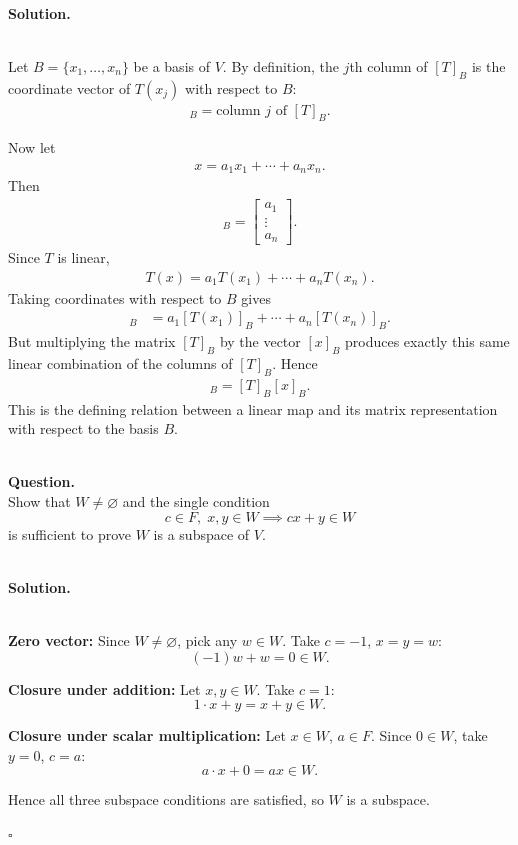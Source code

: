 \documentclass{article}
\begin{document}
\noindent\\
\textbf{Solution.}\\
\quad\\
\begin{mdframed}[linewidth=1pt]
Let $B=\{x_1,\dots,x_n\}$ be a basis of $V$. By definition, the $j$th column of $[T]_B$ is the coordinate vector of $T(x_j)$ with respect to $B$:
\begin{align*}
[T(x_j)]_B=\text{column }j\text{ of }[T]_B.
\end{align*}

Now let
\begin{align*}
x=a_1x_1+\cdots+a_nx_n.
\end{align*}
Then
\begin{align*}
[x]_B=
\begin{bmatrix}
a_1\\
\vdots\\
a_n
\end{bmatrix}.
\end{align*}
Since $T$ is linear,
\begin{align*}
T(x)=a_1T(x_1)+\cdots+a_nT(x_n).
\end{align*}
Taking coordinates with respect to $B$ gives
\begin{align*}
[T(x)]_B
&=a_1[T(x_1)]_B+\cdots+a_n[T(x_n)]_B.
\end{align*}
But multiplying the matrix $[T]_B$ by the vector $[x]_B$ produces exactly this same linear combination of the columns of $[T]_B$. Hence
\begin{align*}
[T(x)]_B=[T]_B[x]_B.
\end{align*}
This is the defining relation between a linear map and its matrix representation with respect to the basis $B$.
\end{mdframed}

\bigskip

\hfill \break  $~\!\!$ \dotfill \medskip \\
\textbf{Question.}\\
Show that $W \neq \varnothing$ and the single condition
\[
c \in F,\; x, y \in W \implies cx + y \in W
\]
is sufficient to prove $W$ is a subspace of $V$.

\noindent\\
\textbf{Solution.}\\
\quad\\
\begin{mdframed}[linewidth=1pt]
\textbf{Zero vector:} Since $W \neq \varnothing$, pick any $w \in W$. Take $c = -1$, $x = y = w$:
\[
(-1)w + w = 0 \in W.
\]

\textbf{Closure under addition:} Let $x, y \in W$. Take $c = 1$:
\[
1 \cdot x + y = x + y \in W.
\]

\textbf{Closure under scalar multiplication:} Let $x \in W$, $a \in F$. Since $0 \in W$, take $y = 0$, $c = a$:
\[
a \cdot x + 0 = ax \in W.
\]

Hence all three subspace conditions are satisfied, so $W$ is a subspace.

\hfill $\square$
\end{mdframed}
\end{document}
